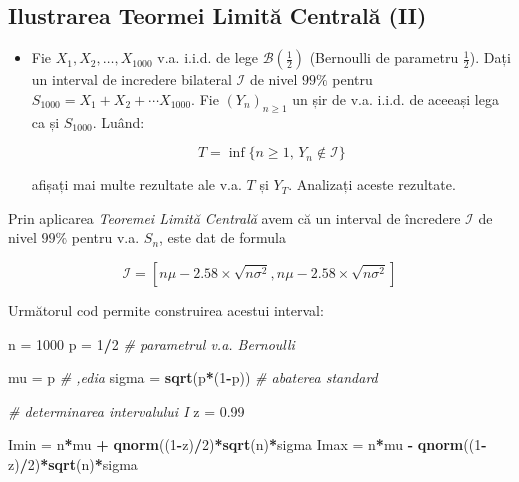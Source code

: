\documentclass[]{article}
\newenvironment{Shaded}{\begin{snugshade}}{\end{snugshade}}
\newcommand{\KeywordTok}[1]{\textcolor[rgb]{0.13,0.29,0.53}{\textbf{#1}}}
\newcommand{\DecValTok}[1]{\textcolor[rgb]{0.00,0.00,0.81}{#1}}
\newcommand{\FloatTok}[1]{\textcolor[rgb]{0.00,0.00,0.81}{#1}}
\newcommand{\StringTok}[1]{\textcolor[rgb]{0.31,0.60,0.02}{#1}}
\newcommand{\CommentTok}[1]{\textcolor[rgb]{0.56,0.35,0.01}{\textit{#1}}}
\newcommand{\OperatorTok}[1]{\textcolor[rgb]{0.81,0.36,0.00}{\textbf{#1}}}
\newcommand{\NormalTok}[1]{#1}
\newenvironment{frshaded*}{%
  \def\FrameCommand{\fboxrule=\FrameRule\fboxsep=\FrameSep \fcolorbox{framecolor}{shadecolor1}}%
  \MakeFramed {\advance\hsize-\width \FrameRestore}}%
{\endMakeFramed}
\newenvironment{rmdblock}[1]
  {\begin{frshaded*}
  \begin{itemize}
  \renewcommand{\labelitemi}{
    \raisebox{-.7\height}[0pt][0pt]{
      {\setkeys{Gin}{width=2em,keepaspectratio}\texttt{[image: images/icons/\#1]}}
    }
  }
  \item
  }
  {
  \end{itemize}
  \end{frshaded*}
  }
\newenvironment{rmdexercise}
  {\begin{rmdblock}{exercise}}
  {\end{rmdblock}}
\begin{document}
\subsection{Ilustrarea Teormei Limită Centrală
(II)}\label{ilustrarea-teormei-limita-centrala-ii}

\begin{rmdexercise}
Fie \(X_1,X_2,\dots,X_{1000}\) v.a. i.i.d. de lege
\(\mathcal{B}(\frac{1}{2})\) (Bernoulli de parametru \(\frac{1}{2}\)).
Dați un interval de incredere bilateral \(\mathcal{I}\) de nivel
\(99\%\) pentru \(S_{1000}=X_1+X_2+\cdots X_{1000}\). Fie
\((Y_n)_{n\geq1}\) un șir de v.a. i.i.d. de aceeași lega ca și
\(S_{1000}\). Luând:

\[
  T=\inf\{n\geq1,\,Y_n\not\in\mathcal{I}\}
\]

afișați mai multe rezultate ale v.a. \(T\) și \(Y_T\). Analizați aceste
rezultate.
\end{rmdexercise}

Prin aplicarea \emph{Teoremei Limită Centrală} avem că un interval de
încredere \(\mathcal{I}\) de nivel \(99\%\) pentru v.a. \(S_n\), este
dat de formula

\[
  \mathcal{I} = \left[n\mu-2.58\times\sqrt{n\sigma^2}, n\mu-2.58\times\sqrt{n\sigma^2}\right]
\]

Următorul cod permite construirea acestui interval:

\begin{Shaded}
\begin{Highlighting}[]
\NormalTok{n =}\StringTok{ }\DecValTok{1000} 
\NormalTok{p =}\StringTok{ }\DecValTok{1}\OperatorTok{/}\DecValTok{2} \CommentTok{# parametrul v.a. Bernoulli}

\NormalTok{mu =}\StringTok{ }\NormalTok{p }\CommentTok{# ,edia }
\NormalTok{sigma =}\StringTok{ }\KeywordTok{sqrt}\NormalTok{(p}\OperatorTok{*}\NormalTok{(}\DecValTok{1}\OperatorTok{-}\NormalTok{p)) }\CommentTok{# abaterea standard}

\CommentTok{# determinarea intervalului I }
\NormalTok{z =}\StringTok{ }\FloatTok{0.99}

\NormalTok{Imin =}\StringTok{ }\NormalTok{n}\OperatorTok{*}\NormalTok{mu }\OperatorTok{+}\StringTok{ }\KeywordTok{qnorm}\NormalTok{((}\DecValTok{1}\OperatorTok{-}\NormalTok{z)}\OperatorTok{/}\DecValTok{2}\NormalTok{)}\OperatorTok{*}\KeywordTok{sqrt}\NormalTok{(n)}\OperatorTok{*}\NormalTok{sigma}
\NormalTok{Imax =}\StringTok{ }\NormalTok{n}\OperatorTok{*}\NormalTok{mu }\OperatorTok{-}\StringTok{ }\KeywordTok{qnorm}\NormalTok{((}\DecValTok{1}\OperatorTok{-}\NormalTok{z)}\OperatorTok{/}\DecValTok{2}\NormalTok{)}\OperatorTok{*}\KeywordTok{sqrt}\NormalTok{(n)}\OperatorTok{*}\NormalTok{sigma}
\end{Highlighting}
\end{Shaded}
\end{document}

